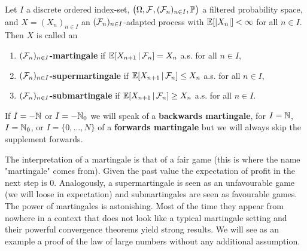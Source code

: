 \begin{ldef}
\begin{deff}\label{def_martingale}
Let $I$ a discrete ordered index-set, $\big(\Omega , \mathcal{F} , (\mathcal{F}_n)_{n\in I}, \mathbb{P}\big)$ a filtered probability space, and $X=(X_n)_{n\in I}$ an $(\mathcal{F}_n)_{n\in I}$-adapted process with $\mathbb{E}[\left| X_n \right| ] < \infty$ for all $ n \in I$. Then $X$ is called an
	\begin{enumerate}[label=(\roman*)]
		\item 
			$(\mathcal{F}_n)_{n\in I}$\textbf{-martingale} if $\mathbb{E}[X_{n+1}\,|\,\mathcal{F}_n]=X_n$ a.s. for all $n\in I$,
		\item
			$(\mathcal{F}_n)_{n\in I}$\textbf{-supermartingale} if $\mathbb{E}[X_{n+1}\,|\,\mathcal{F}_n] \leq X_n$ a.s. for all $ n\in I$,
		\item
			$(\mathcal{F}_n)_{n\in I}$\textbf{-submartingale} if $\mathbb{E}[X_{n+1}\,|\,\mathcal{F}_n] \geq X_n$ a.s. for all $ n\in I$.
	\end{enumerate}
	If $I=-\mathbb{N}$ or $I=-\mathbb{N}_0$ we will speak of a \textbf{backwards martingale}, for $I=\mathbb{N}$, $I=\mathbb{N}_0$, or $I=\{0,...,N\}$ of a \textbf{forwards martingale} but we will always skip the supplement forwards.
\end{deff}
\end{ldef}
The interpretation of a martingale is that of a fair game (this is where the name "{}martingale"{} comes from). Given the past value the expectation of profit in the next step is $0$. Analogously, a supermartingale is seen as an unfavourable game (we will loose in expectation) and submartingales are seen as favourable games. The power of martingales is astonishing. Most of the time they appear from nowhere in a context that does not look like a typical martingale setting and their powerful convergence theorems yield strong results. We will see as an example a proof of the law of large numbers without any additional assumption.\smallskip

